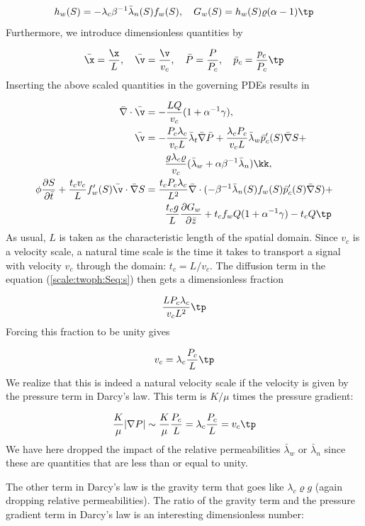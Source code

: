 \documentclass[graybox,envcountchap,sectrefs,final]{svmonodo}
\begin{document}
\[ h_w(S) = -\lambda_c\beta^{-1}\bar\lambda_n(S)f_w(S),\quad
G_w(S) = h_w(S)\varrho(\alpha - 1)\tp\]
Furthermore, we introduce dimensionless quantities by

\[ \bar\x = \frac{\x}{L},\quad \bar\v = \frac{\v}{v_c},\quad
\bar P = \frac{P}{P_c},\quad\bar p_c = \frac{p_c}{P_c}\tp\]
Inserting the above scaled quantities in the governing PDEs results in

\begin{align}
\bar\nabla\cdot\bar\v &= -\frac{LQ}{v_c}(1 + \alpha^{-1}\gamma),
\label{scale:twoph:Peq:s0}\\ 
\bar\v &= -\frac{P_c\lambda_c}{v_c L}\bar\lambda_t\bar\nabla\bar P +
\frac{\lambda_c P_c}{v_c L}\bar\lambda_w \bar p_c'(S)\bar\nabla S +\nonumber\\ 
&\quad\quad\frac{g\lambda_c\varrho}{v_c}
(\bar\lambda_w + \alpha\beta^{-1}\bar\lambda_n)\kk,
\label{scale:twoph:v_teq:s0}\\ 
\phi\frac{\partial S}{\partial\bar t} + \frac{t_cv_c}{L}f_w'(S)\bar\v\cdot
\bar\nabla S &=
\frac{t_c P_c\lambda_c}{L^2}
\bar\nabla\cdot(-\beta^{-1}\bar\lambda_n(S)f_w(S)\bar p_c'(S)\bar\nabla S) + \nonumber\\ 
&\quad\quad \frac{t_c g}{L}\frac{\partial G_w}{\partial\bar z} + t_c f_w Q(1+\alpha^{-1}\gamma) - t_cQ\tp
\label{scale:twoph:Seq:s0}
\end{align}
As usual, $L$ is taken as the characteristic length of the spatial domain.
Since $v_c$ is a velocity scale, a natural time scale is the time it
takes to transport a signal with velocity $v_c$ through the domain:
$t_c = L/v_c$. The diffusion term in the equation
(\ref{scale:twoph:Seq:s}) then gets
a dimensionless fraction

\[ \frac{L P_c\lambda_c}{v_c L^2}\tp\]
Forcing this fraction to be unity gives

\[ v_c = \lambda_c\frac{P_c}{L}\tp\]
We realize that this is indeed a natural velocity scale if the
velocity is given by the pressure term in Darcy's law. This term
is $K/\mu$ times the pressure gradient:

\[ \frac{K}{\mu}|\nabla P| \sim \frac{K}{\mu}\frac{P_c}{L} =
\lambda_c\frac{P_c}{L} = v_c\tp\]
We have here dropped the impact of the
relative permeabilities $\bar\lambda_w$ or
$\bar\lambda_n$ since these are quantities that are less than or equal
to unity.

The other term in Darcy's law is the gravity term that goes like
$\lambda_c \varrho g$ (again dropping relative permeabilities).
The ratio of the gravity term and the pressure gradient term in Darcy's
law is an interesting dimensionless number:
\end{document}
